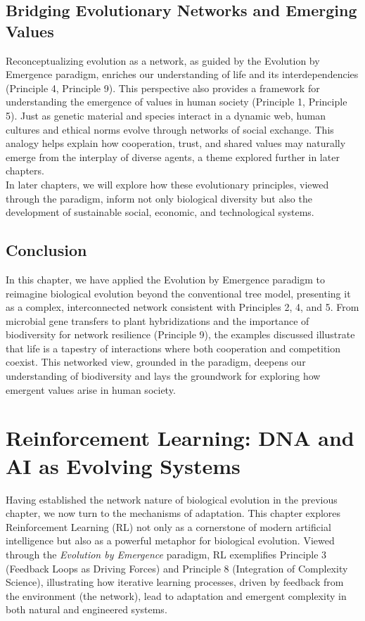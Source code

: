 \documentclass[12pt,openany]{book}
\let\cleardoublepage\clearpage %
\begin{document}
\section{Bridging Evolutionary Networks and Emerging Values}
Reconceptualizing evolution as a network, as guided by the Evolution by Emergence paradigm, enriches our understanding of life and its interdependencies (Principle 4, Principle 9). This perspective also provides a framework for understanding the emergence of values in human society (Principle 1, Principle 5). Just as genetic material and species interact in a dynamic web, human cultures and ethical norms evolve through networks of social exchange. This analogy helps explain how cooperation, trust, and shared values may naturally emerge from the interplay of diverse agents, a theme explored further in later chapters. \\[1ex]
In later chapters, we will explore how these evolutionary principles, viewed through the paradigm, inform not only biological diversity but also the development of sustainable social, economic, and technological systems. %

\section*{Conclusion}
In this chapter, we have applied the Evolution by Emergence paradigm to reimagine biological evolution beyond the conventional tree model, presenting it as a complex, interconnected network consistent with Principles 2, 4, and 5. From microbial gene transfers to plant hybridizations and the importance of biodiversity for network resilience (Principle 9), the examples discussed illustrate that life is a tapestry of interactions where both cooperation and competition coexist. This networked view, grounded in the paradigm, deepens our understanding of biodiversity and lays the groundwork for exploring how emergent values arise in human society. %
\cleardoublepage

\chapter{Reinforcement Learning: DNA and AI as Evolving Systems} %
\label{ch:RL}

Having established the network nature of biological evolution in the previous chapter, we now turn to the mechanisms of adaptation. This chapter explores Reinforcement Learning (RL) not only as a cornerstone of modern artificial intelligence but also as a powerful metaphor for biological evolution. Viewed through the \emph{Evolution by Emergence} paradigm, RL exemplifies Principle 3 (Feedback Loops as Driving Forces) and Principle 8 (Integration of Complexity Science), illustrating how iterative learning processes, driven by feedback from the environment (the network), lead to adaptation and emergent complexity in both natural and engineered systems. %
\end{document}

